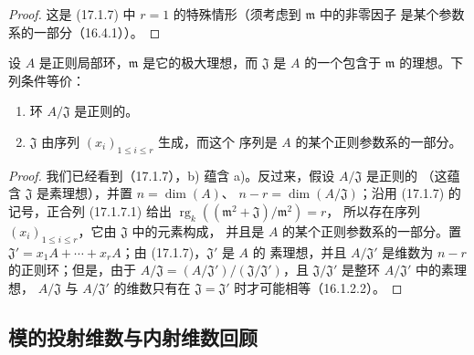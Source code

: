 \begin{proof}
这是 (17.1.7) 中 $r=1$ 的特殊情形（须考虑到 $\mathfrak{m}$ 中的非零因子
是某个参数系的一部分（16.4.1））。
\end{proof}

\begin{corollary}[17.1.9]
\label{0.17.1.9-fr}
设 $A$ 是正则局部环，$\mathfrak{m}$ 是它的极大理想，而 $\mathfrak{J}$ 是
$A$ 的一个包含于 $\mathfrak{m}$ 的理想。下列条件等价：
\begin{enumerate}
  \item[\rm a)] 环 $A/\mathfrak{J}$ 是正则的。
  \item[\rm b)] $\mathfrak{J}$ 由序列 $(x_i)_{1\leq i\leq r}$ 生成，而这个
  序列是 $A$ 的某个正则参数系的一部分。
\end{enumerate}
\end{corollary}

\begin{proof}
我们已经看到（17.1.7），b) 蕴含 a)。反过来，假设 $A/\mathfrak{J}$ 是正则的
（这蕴含 $\mathfrak{J}$ 是素理想），并置 $n=\dim(A)$、
$n-r=\dim(A/\mathfrak{J})$；沿用 (17.1.7) 的记号，正合列 (17.1.7.1)
给出
$\operatorname{rg}_k((\mathfrak{m}^2+\mathfrak{J})/\mathfrak{m}^2)=r$，
所以存在序列 $(x_i)_{1\leq i\leq r}$，它由 $\mathfrak{J}$ 中的元素构成，
并且是 $A$ 的某个正则参数系的一部分。置
$\mathfrak{J}'=x_1A+\cdots+x_rA$；由 (17.1.7)，$\mathfrak{J}'$ 是 $A$ 的
素理想，并且 $A/\mathfrak{J}'$ 是维数为 $n-r$ 的正则环；但是，由于
$A/\mathfrak{J}=(A/\mathfrak{J}')/(\mathfrak{J}/\mathfrak{J}')$，且
$\mathfrak{J}/\mathfrak{J}'$ 是整环 $A/\mathfrak{J}'$ 中的素理想，
$A/\mathfrak{J}$ 与 $A/\mathfrak{J}'$ 的维数只有在
$\mathfrak{J}=\mathfrak{J}'$ 时才可能相等（16.1.2.2）。
\end{proof}

\subsection{模的投射维数与内射维数回顾}
\label{subsection:0.17.2-fr}

